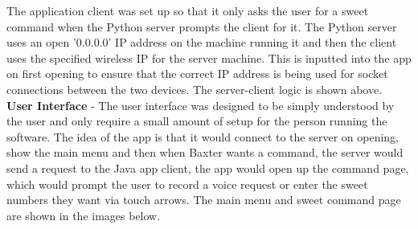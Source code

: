 The application client was set up so that it only asks the user for a sweet command when the Python server prompts the client for it. The Python server uses an open '0.0.0.0' IP address on the machine running it and then the client uses the specified wireless IP for the server machine. This is inputted into the app on first opening to ensure that the correct IP address is being used for socket connections between the two devices. The server-client logic is shown above.
\newline\newline
\textbf{User Interface} - The user interface was designed to be simply understood by the user and only require a small amount of setup for the person running the software. The idea of the app is that it would connect to the server on opening, show the main menu and then when Baxter wants a command, the server would send a request to the Java app client, the app would open up the command page, which would prompt the user to record a voice request or enter the sweet numbers they want via touch arrows. The main menu and sweet command page are shown in the images below.
